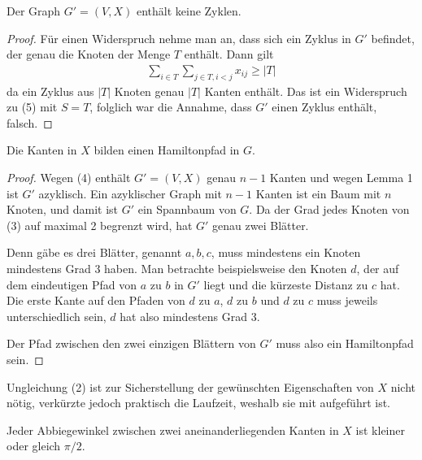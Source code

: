 \documentclass[a4paper, 10pt, ngerman]{article}
\begin{document}
\begin{lemma}
    Der Graph $G' = (V, X)$ enthält keine Zyklen.
\end{lemma}

\begin{proof}
    Für einen Widerspruch nehme man an, dass sich ein Zyklus in $G'$ befindet, der genau die Knoten der Menge $T$ enthält. Dann gilt
    \begin{align*}
        \sum_{i \in T} \sum_{j \in T, i < j} x_{ij} \ge |T|
    \end{align*}
    da ein Zyklus aus $|T|$ Knoten genau $|T|$ Kanten enthält. Das ist ein Widerspruch zu (5) mit $S = T$, folglich war die Annahme, dass $G'$ einen Zyklus enthält, falsch.
\end{proof}

\begin{lemma}
    Die Kanten in $X$ bilden einen Hamiltonpfad in $G$.
\end{lemma}

\begin{proof}
    Wegen (4) enthält $G' = (V, X)$ genau $n - 1$ Kanten und wegen Lemma 1 ist $G'$ azyklisch. Ein azyklischer Graph mit $n - 1$ Kanten ist ein Baum mit $n$ Knoten, und damit ist $G'$ ein Spannbaum von $G$. Da der Grad jedes Knoten von (3) auf maximal 2 begrenzt wird, hat $G'$ genau zwei Blätter.
    
    Denn gäbe es drei Blätter, genannt $a, b, c$, muss mindestens ein Knoten mindestens Grad 3 haben. Man betrachte beispielsweise den Knoten $d$, der auf dem eindeutigen Pfad von $a$ zu $b$ in $G'$ liegt und die kürzeste Distanz zu $c$ hat. Die erste Kante auf den Pfaden von $d$ zu $a$, $d$ zu $b$ und $d$ zu $c$ muss jeweils unterschiedlich sein, $d$ hat also mindestens Grad 3.
    
    Der Pfad zwischen den zwei einzigen Blättern von $G'$ muss also ein Hamiltonpfad sein.
\end{proof}
 
Ungleichung (2) ist zur Sicherstellung der gewünschten Eigenschaften von $X$ nicht nötig, verkürzte jedoch praktisch die Laufzeit, weshalb sie mit aufgeführt ist.

\begin{lemma}
    Jeder Abbiegewinkel zwischen zwei aneinanderliegenden Kanten in $X$ ist kleiner oder gleich $\pi / 2$.
\end{lemma}
\end{document}
